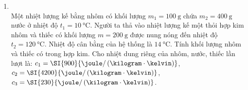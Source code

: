 \begin{enumerate}[label=\bfseries Câu \arabic*:, leftmargin=1.7cm]
\item {}\\
Một nhiệt lượng kế bằng nhôm có khối lượng $m_1 = \SI{100}{\gram}$ chứa $m_2 =\SI{400}{\gram}$ nước ở nhiệt độ $t_1 =\SI{10}{\celsius}$. Người ta thả vào nhiệt lượng kế một thỏi hợp kim nhôm và thiếc có khối lượng $m = \SI{200}{\gram}$ được nung nóng đến nhiệt độ $t_2 =\SI{120}{\celsius}$. Nhiệt độ cân bằng của hệ thống là $\SI{14}{\celsius}$. Tính khối lượng nhôm và thiếc có trong hợp kim. Cho nhiệt dung riêng của nhôm, nước, thiếc lần lượt là: $c_1 =\SI{900}{\joule/\left(\kilogram\cdot\kelvin\right)}$, $c_2=\SI{4200}{\joule/\left(\kilogram\cdot\kelvin\right)}$, $c_3 =\SI{230}{\joule/\left(\kilogram\cdot\kelvin\right)}$.


\end{enumerate}
